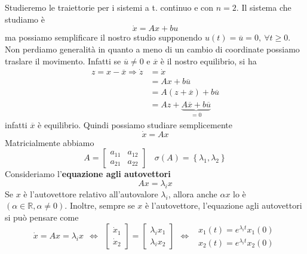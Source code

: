 \documentclass[10pt,a4paper]{book}
\begin{document}
Studieremo le traiettorie per i sistemi a t. continuo e con $n=2$. Il sistema che studiamo è
\begin{equation*}
	\dot{x} =Ax+bu
\end{equation*}
ma possiamo semplificare il nostro studio supponendo $u\left(t\right) =\overline{u} =0,\ \forall t\geqslant 0$. Non perdiamo generalità in quanto a meno di un cambio di coordinate possiamo traslare il movimento. Infatti se $\overline{u} \neq 0$ e $\overline{x}$ è il nostro equilibrio, si ha
\begin{equation*}
	\begin{aligned}
		z=x-\overline{x} \Rightarrow \dot{z} & =\dot{x}                                           \\
		                                     & =Ax+b\overline{u}                                  \\
		                                     & =A\left(z+\overline{x}\right) +b\overline{u}       \\
		                                     & =Az+\underbrace{A\overline{x} +b\overline{u}}_{=0} 
	\end{aligned}
\end{equation*}
infatti $\overline{x}$ è equilibrio. Quindi possiamo studiare semplicemente
\begin{equation*}
	\dot{x} =Ax
\end{equation*}
Matricialmente abbiamo
\begin{equation*}
	A=\begin{bmatrix}
	a_{11} & a_{12}\\
	a_{21} & a_{22}
	\end{bmatrix} \ \ \ \ \sigma \left(A\right) =\left\{\lambda _1 ,\lambda _2\right\}
\end{equation*}
Consideriamo l'\textbf{equazione agli autovettori}
\begin{equation*}
	\boxed{Ax=\lambda _i x}
\end{equation*}
Se $x$ è l'autovettore relativo all'autovalore $\lambda _i$, allora anche $\alpha x$ lo è $\left(\alpha \in \mathbb{R} ,\alpha \neq 0\right)$. Inoltre, sempre se $x$ è l'autovettore, l'equazione agli autovettori si può pensare come
\begin{equation*}
	\dot{x} =Ax=\lambda _i x\ \ \Leftrightarrow \ \ \begin{bmatrix}
	\dot{x}_1\\
	\dot{x}_2
	\end{bmatrix} =\begin{bmatrix}
	\lambda _i x_1\\
	\lambda _i x_2
	\end{bmatrix} \ \ \Leftrightarrow \ \ \begin{array}{ c }
	x_1\left(t\right) =e^{\lambda _i t} x_1\left(0\right)\\
	x_2\left(t\right) =e^{\lambda _i t} x_2\left(0\right)
	\end{array}
\end{equation*}
\end{document}
